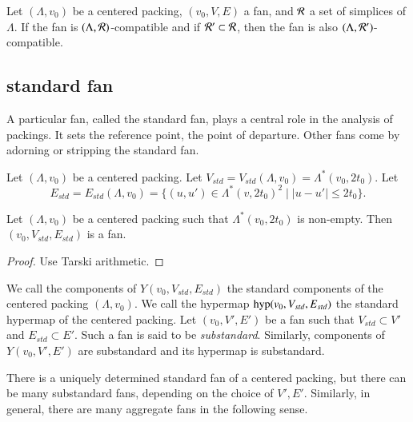 \begin{lemma}
Let $(\Lambda,v_0)$ be a centered packing, $(v_0,V,E)$ a fan, and ${\mathcal R}$ a set of simplices of $\Lambda$.
If the fan is $(\Lambda,{\mathcal R})$-compatible and if
 ${\mathcal R}'\subset{\mathcal R}$, then the fan is also $(\Lambda,{\mathcal R}')$-compatible.
\end{lemma}

\subsection{standard fan}

A particular fan, called the standard fan, 
plays a central role in the analysis of
packings.  It  sets  the reference point, the point
of departure.  Other fans come by adorning  or stripping the
standard fan.


\begin{definition}
Let $(\Lambda,v_0)$ be a centered packing.  
Let $V_{std}=V_{std}(\Lambda,v_0)=\Lambda^*(v_0,2t_0)$.
Let 
$$E_{std} = E_{std}(\Lambda,v_0) = \{(u,u')\in \Lambda^*(v,2t_0)^2 \mid |u-u'|\le 2t_0\}.
$$
\end{definition}


\begin{lemma}
Let $(\Lambda,v_0)$ be a centered packing such that $\Lambda^*(v_0,2t_0)$
is non-empty.
Then $(v_0,V_{std},E_{std})$ is a fan.
\end{lemma}

\begin{proof}
Use Tarski arithmetic.
\end{proof}

\begin{definition}  
We call the
components of $Y(v_0,V_{std},E_{std})$ the standard components of the centered
packing $(\Lambda,v_0)$.  We call the hypermap ${\operatorname{hyp}}(v_0,V_{std},E_{std})$
the standard hypermap of the centered packing.  
Let $(v_0,V',E')$ be a fan such that $V_{std}\subset V'$ and
$E_{std}\subset E'$.  Such a fan is said to be {\it substandard}.
Similarly,  components of $Y(v_0,V',E')$ are substandard and
its hypermap is substandard.
\end{definition}

There is a uniquely determined standard fan of a centered packing,
but there can be many substandard fans, depending on the choice
of $V',E'$.  Similarly, in general, there are many aggregate fans
in the following sense.  

